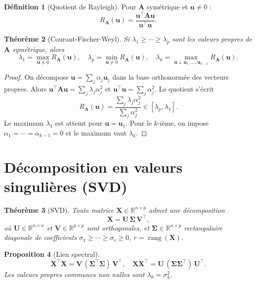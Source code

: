\documentclass[11pt, a4paper, openany]{book}
\theoremstyle{plain}
\newtheorem{theorem}{Théorème}[chapter]
\newtheorem{proposition}[theorem]{Proposition}
\theoremstyle{definition}
\newtheorem{definition}[theorem]{Définition}
\theoremstyle{remark}
\newcommand{\R}{\mathbb{R}}
\newcommand{\1}{\mathds{1}}
\DeclareMathOperator{\rang}{rang}
\newcommand{\X}{\mathbf{X}}
\newcommand{\U}{\mathbf{U}}
\newcommand{\bSigma}{\mathbf{\Sigma}}
\begin{document}
\begin{definition}[Quotient de Rayleigh]
Pour $\mathbf{A}$ symétrique et $\mathbf{u} \neq 0$ :
\[
R_{\mathbf{A}}(\mathbf{u}) = \frac{\mathbf{u}^\top \mathbf{A} \mathbf{u}}{\mathbf{u}^\top \mathbf{u}}.
\]
\end{definition}

\begin{theorem}[Courant-Fischer-Weyl]
Si $\lambda_1 \geq \cdots \geq \lambda_p$ sont les valeurs propres de
$\mathbf{A}$ symétrique, alors
\[
\lambda_1 = \max_{\mathbf{u} \neq 0} R_{\mathbf{A}}(\mathbf{u}),\quad
\lambda_p = \min_{\mathbf{u} \neq 0} R_{\mathbf{A}}(\mathbf{u}),\quad
\lambda_k = \max_{\mathbf{u} \perp \mathbf{u}_1, \ldots, \mathbf{u}_{k-1}} R_{\mathbf{A}}(\mathbf{u}).
\]
\end{theorem}

\begin{proof}
On décompose $\mathbf{u} = \sum_j \alpha_j \mathbf{u}_j$ dans la base orthonormée des vecteurs
propres. Alors $\mathbf{u}^\top \mathbf{A} \mathbf{u} = \sum_j \lambda_j \alpha_j^2$ et
$\mathbf{u}^\top \mathbf{u} = \sum_j \alpha_j^2$. Le quotient s'écrit
\[
R_{\mathbf{A}}(\mathbf{u}) = \frac{\sum_j \lambda_j \alpha_j^2}{\sum_j \alpha_j^2}
\in [\lambda_p, \lambda_1].
\]
Le maximum $\lambda_1$ est atteint pour $\mathbf{u} = \mathbf{u}_1$. Pour le $k$-ième, on impose
$\alpha_1 = \cdots = \alpha_{k-1} = 0$ et le maximum vaut $\lambda_k$.
\end{proof}

\section{Décomposition en valeurs singulières (SVD)}

\begin{theorem}[SVD]
Toute matrice $\X \in \R^{n \times p}$ admet une décomposition
\[
\X = \U\, \bSigma\, \mathbf{V}^\top,
\]
où $\U \in \R^{n \times n}$ et $\mathbf{V} \in \R^{p \times p}$ sont orthogonales,
et $\bSigma \in \R^{n \times p}$ rectangulaire diagonale de coefficients
$\sigma_1 \geq \cdots \geq \sigma_r \geq 0$, $r = \rang(\X)$.
\end{theorem}

\begin{proposition}[Lien spectral]
\[
\X^\top \X = \mathbf{V}\, (\bSigma^\top \bSigma)\, \mathbf{V}^\top, \quad
\X \X^\top = \U\, (\bSigma \bSigma^\top)\, \U^\top.
\]
Les valeurs propres communes non nulles sont $\lambda_k = \sigma_k^2$.
\end{proposition}
\end{document}
